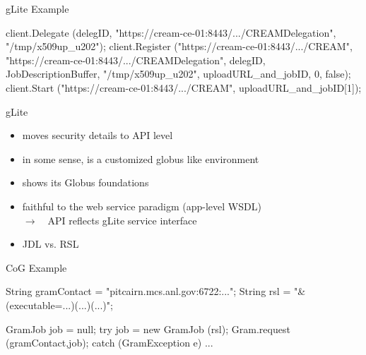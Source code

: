 \documentclass[%
  pdf,
  colorBG,
  slideColor,
  frames,
  ogf
]{prosper}
\newcommand{\RA}{$\rightarrow$~~}
\newcommand{\dn}{\vspace*{+1em}}
\begin{document}

 \begin{slide}{gLite Example}

  \begin{mycode}[label=gLite: Job Submit]

  client.Delegate (delegID,
                   "https://cream-ce-01:8443/.../CREAMDelegation", 
                   "/tmp/x509up_u202");      
  client.Register ("https://cream-ce-01:8443/.../CREAM",
                   "https://cream-ce-01:8443/.../CREAMDelegation",
                   delegID,                 
                   JobDescriptionBuffer,              
                   "/tmp/x509up_u202",    
                   uploadURL_and_jobID,  
                   0, false);           
  client.Start    ("https://cream-ce-01:8443/.../CREAM",
                   uploadURL_and_jobID[1]);

  \end{mycode}

 \end{slide}


 \begin{slide}{gLite}

  \dn 

  \begin{itemize}
   \item moves security details to API level
   \item in some sense, is a customized globus like environment
   \item shows its Globus foundations
   \item faithful to the web service paradigm (app-level WSDL)\\
         \RA API reflects gLite service interface
   \item JDL vs. RSL
  \end{itemize}

 \end{slide}


 \begin{slide}{CoG Example}

  \begin{mycode}[label=CoG: Job Submit]

  String gramContact = "pitcairn.mcs.anl.gov:6722:...";
  String rsl         = "&(executable=...)(...)(...)";
  
  GramJob job = null;
  try {
     job = new GramJob (rsl);
     Gram.request (gramContact,job);
  } 
  catch (GramException e) {
     ...
  }
     
  \end{mycode}

 \end{slide}
\end{document}
